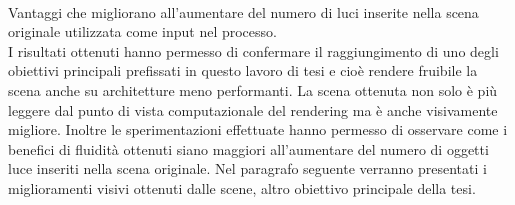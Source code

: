 \\
Vantaggi che  migliorano all’aumentare del numero di luci inserite nella scena originale utilizzata come input nel processo.
\\
I risultati ottenuti hanno permesso di confermare il raggiungimento di uno degli obiettivi principali prefissati in questo lavoro di tesi e cioè rendere fruibile la scena anche su architetture meno performanti.
La scena ottenuta non solo è più leggere dal punto di vista computazionale del rendering ma è anche visivamente migliore.
Inoltre le sperimentazioni effettuate hanno permesso di osservare come i benefici di fluidità ottenuti siano maggiori all'aumentare del numero di oggetti luce inseriti nella scena originale.
Nel paragrafo seguente verranno presentati i miglioramenti visivi ottenuti dalle scene, altro obiettivo principale della tesi.

